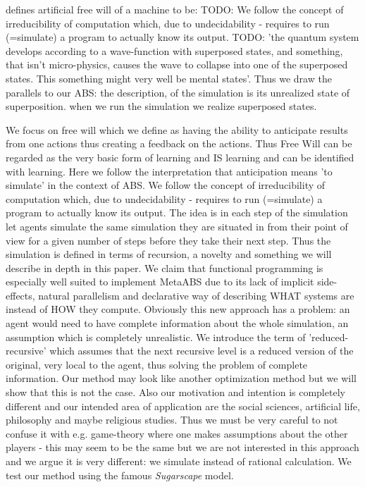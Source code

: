 \cite{irtem_simulation_1978} defines artificial free will of a machine to be:
TODO: We follow the concept of irreducibility of computation which, due to undecidability - requires to run (=simulate) a program to actually know its output.
TODO: 'the quantum system develops according to a wave-function with superposed states, and something, that isn't micro-physics, causes the wave to collapse into one of the superposed states. This something might very well be mental states'. Thus we draw the parallels to our ABS: the description, of the simulation is its unrealized state of superposition. when we run the simulation we realize superposed states. 

We focus on free will which we define as having the ability to anticipate results from one actions thus creating a feedback on the actions. Thus Free Will can be regarded as the very basic form of learning and IS learning and can be identified with learning. Here we follow the interpretation that anticipation means 'to simulate' in the context of ABS. We follow the concept of irreducibility of computation which, due to undecidability - requires to run (=simulate) a program to actually know its output. The idea is in each step of the simulation let agents simulate the same simulation they are situated in from their point of view for a given number of steps before they take their next step. Thus the simulation is defined in terms of recursion, a novelty and something we will describe in depth in this paper. We claim that functional programming is especially well suited to implement MetaABS due to its lack of implicit side-effects, natural parallelism and declarative way of describing WHAT systems are instead of HOW they compute. Obviously this new approach has a problem: an agent would need to have complete information about the whole simulation, an assumption which is completely unrealistic. We introduce the term of 'reduced-recursive' which assumes that the next recursive level is a reduced version of the original, very local to the agent, thus solving the problem of complete information.
Our method may look like another optimization method but we will show that this is not the case. Also our motivation and intention is completely different and our intended area of application are the social sciences, artificial life, philosophy and maybe religious studies. Thus we must be very careful to not confuse it with e.g. game-theory where one makes assumptions about the other players - this may seem to be the same but we are not interested in this approach and we argue it is very different: we simulate instead of rational calculation. We test our method using the famous \textit{Sugarscape} model.

